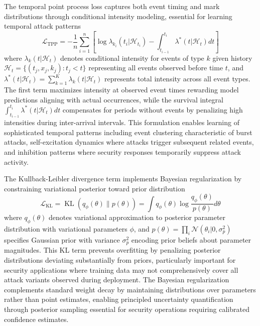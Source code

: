 \documentclass[10pt,journal,compsoc]{IEEEtran}
\DeclareMathOperator{\KL}{KL}
\begin{document}
The temporal point process loss captures both event timing and mark distributions through conditional intensity modeling, essential for learning temporal attack patterns
\begin{equation}
\mathcal{L}_{\text{TPP}} = -\frac{1}{n}\sum_{i=1}^n \left[ \log \lambda_{k_i}(t_i | \mathcal{H}_{t_i}) - \int_{t_{i-1}}^{t_i} \lambda^*(t | \mathcal{H}_t) dt \right]
\label{eq:tpp_loss}
\end{equation}
where $\lambda_{k}(t | \mathcal{H}_t)$ denotes conditional intensity for events of type $k$ given history $\mathcal{H}_t = \{(t_j, x_j, k_j) : t_j < t\}$ representing all events observed before time $t$, and $\lambda^*(t | \mathcal{H}_t) = \sum_{k=1}^K \lambda_k(t | \mathcal{H}_t)$ represents total intensity across all event types. The first term maximizes intensity at observed event times rewarding model predictions aligning with actual occurrences, while the survival integral $\int_{t_{i-1}}^{t_i} \lambda^*(t | \mathcal{H}_t) dt$ compensates for periods without events by penalizing high intensities during inter-arrival intervals. This formulation enables learning of sophisticated temporal patterns including event clustering characteristic of burst attacks, self-excitation dynamics where attacks trigger subsequent related events, and inhibition patterns where security responses temporarily suppress attack activity.

The Kullback-Leibler divergence term implements Bayesian regularization by constraining variational posterior toward prior distribution
\begin{equation}
\mathcal{L}_{\text{KL}} = \KL(q_\phi(\theta) \| p(\theta)) = \int q_\phi(\theta) \log \frac{q_\phi(\theta)}{p(\theta)} d\theta
\end{equation}
where $q_\phi(\theta)$ denotes variational approximation to posterior parameter distribution with variational parameters $\phi$, and $p(\theta) = \prod_i \mathcal{N}(\theta_i | 0, \sigma_p^2)$ specifies Gaussian prior with variance $\sigma_p^2$ encoding prior beliefs about parameter magnitudes. This KL term prevents overfitting by penalizing posterior distributions deviating substantially from priors, particularly important for security applications where training data may not comprehensively cover all attack variants observed during deployment. The Bayesian regularization complements standard weight decay by maintaining distributions over parameters rather than point estimates, enabling principled uncertainty quantification through posterior sampling essential for security operations requiring calibrated confidence estimates.
\end{document}
